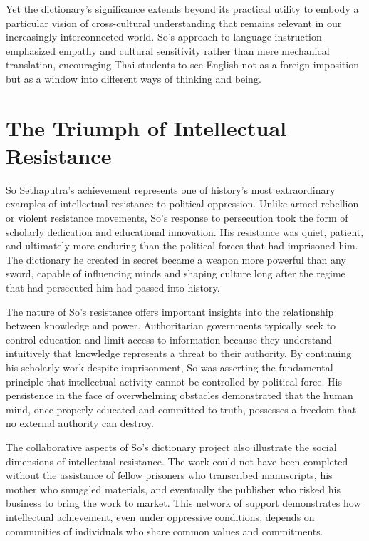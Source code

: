 \documentclass[
  Letterpaper,
]{scrbook}
\begin{document}
Yet the dictionary's significance extends beyond its practical utility
to embody a particular vision of cross-cultural understanding that
remains relevant in our increasingly interconnected world. So's approach
to language instruction emphasized empathy and cultural sensitivity
rather than mere mechanical translation, encouraging Thai students to
see English not as a foreign imposition but as a window into different
ways of thinking and being.

\section{The Triumph of Intellectual
Resistance}\label{the-triumph-of-intellectual-resistance}

So Sethaputra's achievement represents one of history's most
extraordinary examples of intellectual resistance to political
oppression. Unlike armed rebellion or violent resistance movements, So's
response to persecution took the form of scholarly dedication and
educational innovation. His resistance was quiet, patient, and
ultimately more enduring than the political forces that had imprisoned
him. The dictionary he created in secret became a weapon more powerful
than any sword, capable of influencing minds and shaping culture long
after the regime that had persecuted him had passed into history.

The nature of So's resistance offers important insights into the
relationship between knowledge and power. Authoritarian governments
typically seek to control education and limit access to information
because they understand intuitively that knowledge represents a threat
to their authority. By continuing his scholarly work despite
imprisonment, So was asserting the fundamental principle that
intellectual activity cannot be controlled by political force. His
persistence in the face of overwhelming obstacles demonstrated that the
human mind, once properly educated and committed to truth, possesses a
freedom that no external authority can destroy.

The collaborative aspects of So's dictionary project also illustrate the
social dimensions of intellectual resistance. The work could not have
been completed without the assistance of fellow prisoners who
transcribed manuscripts, his mother who smuggled materials, and
eventually the publisher who risked his business to bring the work to
market. This network of support demonstrates how intellectual
achievement, even under oppressive conditions, depends on communities of
individuals who share common values and commitments.
\end{document}
